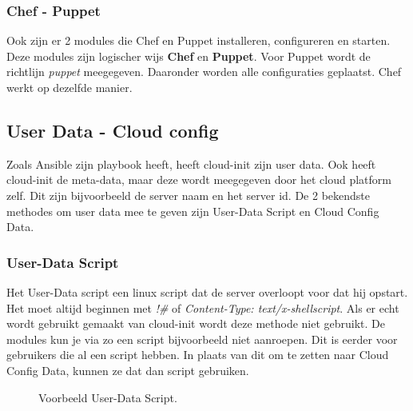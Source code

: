 \subsubsection{Chef - Puppet}
Ook zijn er 2 modules die Chef en Puppet installeren, configureren en starten. Deze modules zijn logischer wijs \textbf{Chef} en \textbf{Puppet}. Voor Puppet wordt de richtlijn \textit{puppet} meegegeven. Daaronder worden alle configuraties geplaatst. Chef werkt op dezelfde manier.

\subsection{User Data - Cloud config}
Zoals Ansible zijn playbook heeft, heeft cloud-init zijn user data. Ook heeft cloud-init de meta-data, maar deze wordt meegegeven door het cloud platform zelf. Dit zijn bijvoorbeeld de server naam en het server id. De 2 bekendste methodes om user data mee te geven zijn User-Data Script en Cloud Config Data. 
\subsubsection{User-Data Script}
Het User-Data script een linux script dat de server overloopt voor dat hij opstart. Het moet altijd beginnen met \textit{!\#} of \textit{Content-Type: text/x-shellscript}. Als er echt wordt gebruikt gemaakt van cloud-init wordt deze methode niet gebruikt. De modules kun je via zo een script bijvoorbeeld niet aanroepen. Dit is eerder voor gebruikers die al een script hebben. In plaats van dit om te zetten naar Cloud Config Data, kunnen ze dat dan script gebruiken.
\begin{figure}[!htb]
	\caption{Voorbeeld User-Data Script.}
	\label{fig:udatascript}
\end{figure}

